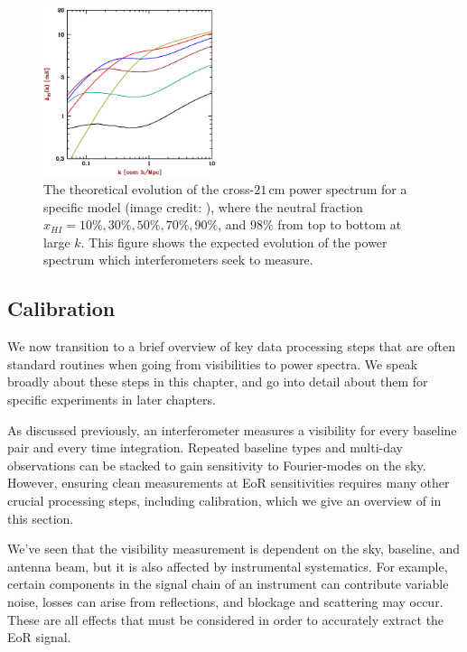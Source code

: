 \begin{figure}
    \centering
    \includegraphics[width=0.45\textwidth]{plots/PS_evolution.eps}
    \caption{The theoretical evolution of the cross-$21$\,cm power spectrum for a specific model (image credit: \citet{barkana2009}), where the neutral fraction $x_{HI} = 10\%, 30\%, 50\%, 70\%, 90\%$, and $98\%$ from top to bottom at large $k$. This figure shows the expected evolution of the power spectrum which interferometers seek to measure.}
    \label{fig:PS_evolution}
\end{figure}

\subsection{Calibration}

We now transition to a brief overview of key data processing steps that are often standard routines when going from visibilities to power spectra. We speak broadly about these steps in this chapter, and go into detail about them for specific experiments in later chapters.

As discussed previously, an interferometer measures a visibility for every baseline pair and every time integration. Repeated baseline types and multi-day observations can be stacked to gain sensitivity to Fourier-modes on the sky. However, ensuring clean measurements at EoR sensitivities requires many other crucial processing steps, including calibration, which we give an overview of in this section.

We've seen that the visibility measurement is dependent on the sky, baseline, and antenna beam, but it is also affected by instrumental systematics. For example, certain components in the signal chain of an instrument can contribute variable noise, losses can arise from reflections, and blockage and scattering may occur. These are all effects that must be considered in order to accurately extract the EoR signal. 

